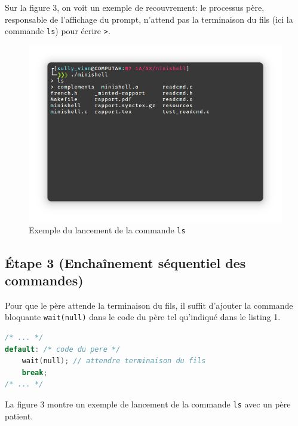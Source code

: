 \documentclass{article}
\begin{document}
Sur la figure 3, on voit un exemple de recouvrement: le processus père, responsable de l'affichage du prompt, n'attend pas la terminaison du fils (ici la commande \texttt{ls}) pour écrire \texttt{>}.

\begin{figure}[H]
    \centering
    \includegraphics[width=1\textwidth]{./resources/E2.png}
    \caption{Exemple du lancement de la commande \texttt{ls}}
\end{figure}

\subsection*{Étape 3 (Enchaînement séquentiel des commandes)}

Pour que le père attende la terminaison du fils, il suffit d'ajouter la commande bloquante \texttt{wait(null)} dans le code du père tel qu'indiqué dans le listing 1.

\begin{lstlisting}[language=C, caption=Ajout pour la question 3]
/* ... */
default: /* code du pere */
    wait(null); // attendre terminaison du fils
    break;
/* ... */
\end{lstlisting}

La figure 3 montre un exemple de lancement de la commande \texttt{ls} avec un père patient.
\end{document}

